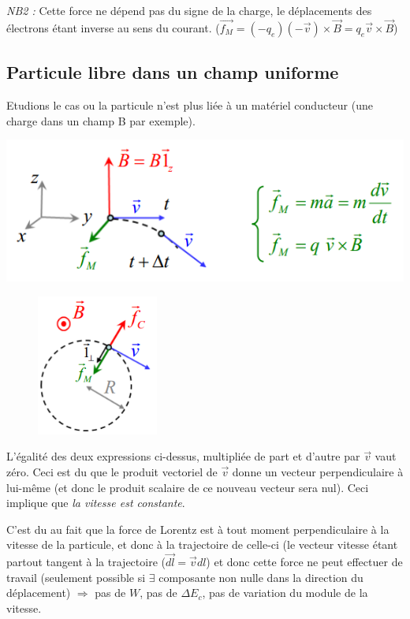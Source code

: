 \documentclass	[11pt, a4paper, openany]{book}
\begin{document}
\textit{NB2 :} Cette force ne dépend pas du signe de la charge, le déplacements des électrons étant inverse au sens du courant. ($\vec{f_M} = (-q_e)(-\vec{v})\times \vec{B} = q_e \vec{v} \times \vec{B}$) \\

\subsection{Particule libre dans un champ uniforme}
Etudions le cas ou la particule n'est plus liée à un matériel conducteur (une charge dans un champ B par exemple).
\begin{center}
\includegraphics[scale=0.75]{magneto/image2.png}
\end{center}
\begin{figure}
\includegraphics[width=4cm]{magneto/image3.png}
\end{figure}
L'égalité des deux expressions ci-dessus, multipliée de part et d'autre par $\vec{v}$ vaut zéro. Ceci est du que le produit vectoriel de $\vec{v}$ donne un vecteur perpendiculaire à lui-même (et donc le produit scalaire de ce nouveau vecteur sera nul). Ceci implique que \textit{la vitesse est constante}.

C'est du au fait que la force de Lorentz est à tout moment perpendiculaire à la vitesse de la particule, et donc à la trajectoire de celle-ci (le vecteur vitesse étant partout tangent à la trajectoire ($\vec{dl} = \vec{v}dl$) et donc cette force ne peut effectuer de travail (seulement possible si $\exists$ composante non nulle dans la direction du déplacement) $\Rightarrow$ pas de $W$, pas de $\Delta E_c$, pas de variation du module de la vitesse.\\
\end{document}
